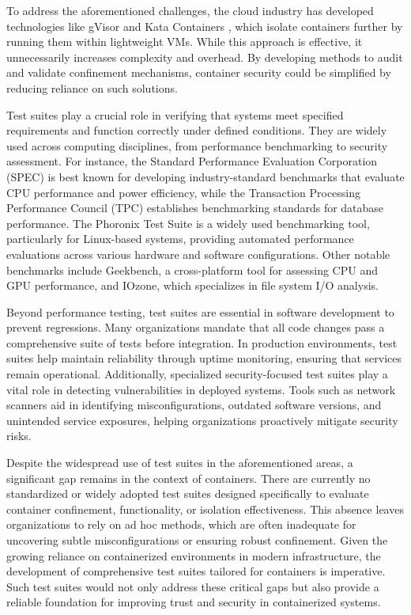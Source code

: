 To address the aforementioned challenges, the cloud industry has developed technologies like gVisor and Kata Containers \cite{sultan2019container}, which isolate containers further by running them within lightweight VMs. While this approach is effective, it unnecessarily increases complexity and overhead. By developing methods to audit and validate confinement mechanisms, container security could be simplified by reducing reliance on such solutions.

Test suites play a crucial role in verifying that systems meet specified requirements and function correctly under defined conditions. They are widely used across computing disciplines, from performance benchmarking to security assessment. For instance, the Standard Performance Evaluation Corporation (SPEC) \cite{henning2000spec} is best known for developing industry-standard benchmarks that evaluate CPU performance and power efficiency, while the Transaction Processing Performance Council (TPC) \cite{10.1007/978-3-642-18206-8_1} establishes benchmarking standards for database performance. The Phoronix Test Suite \cite{zboril2025performance} is a widely used benchmarking tool, particularly for Linux-based systems, providing automated performance evaluations across various hardware and software configurations. Other notable benchmarks include Geekbench, a cross-platform tool for assessing CPU and GPU performance, and IOzone, which specializes in file system I/O analysis.

Beyond performance testing, test suites are essential in software development to prevent regressions. Many organizations mandate that all code changes pass a comprehensive suite of tests before integration. In production environments, test suites help maintain reliability through uptime monitoring, ensuring that services remain operational. Additionally, specialized security-focused test suites play a vital role in detecting vulnerabilities in deployed systems. Tools such as network scanners aid in identifying misconfigurations, outdated software versions, and unintended service exposures, helping organizations proactively mitigate security risks.

Despite the widespread use of test suites in the aforementioned areas, a significant gap remains in the context of containers. There are currently no standardized or widely adopted test suites designed specifically to evaluate container confinement, functionality, or isolation effectiveness. This absence leaves organizations to rely on ad hoc methods, which are often inadequate for uncovering subtle misconfigurations or ensuring robust confinement. Given the growing reliance on containerized environments in modern infrastructure, the development of comprehensive test suites tailored for containers is imperative. Such test suites would not only address these critical gaps but also provide a reliable foundation for improving trust and security in containerized systems.

